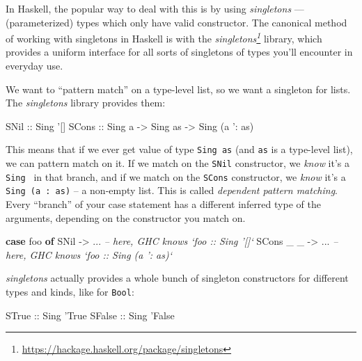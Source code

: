 \documentclass[]{article}
\newenvironment{Shaded}{}{}
\newcommand{\KeywordTok}[1]{\textcolor[rgb]{0.00,0.44,0.13}{\textbf{{#1}}}}
\newcommand{\DataTypeTok}[1]{\textcolor[rgb]{0.56,0.13,0.00}{{#1}}}
\newcommand{\CharTok}[1]{\textcolor[rgb]{0.25,0.44,0.63}{{#1}}}
\newcommand{\CommentTok}[1]{\textcolor[rgb]{0.38,0.63,0.69}{\textit{{#1}}}}
\newcommand{\OtherTok}[1]{\textcolor[rgb]{0.00,0.44,0.13}{{#1}}}
\newcommand{\FunctionTok}[1]{\textcolor[rgb]{0.02,0.16,0.49}{{#1}}}
\newcommand{\NormalTok}[1]{{#1}}
\renewcommand{\href}[2]{#2\footnote{\url{#1}}}
\begin{document}
In Haskell, the popular way to deal with this is by using \emph{singletons} ---
(parameterized) types which only have valid constructor. The canonical method of
working with singletons in Haskell is with the
\emph{\href{https://hackage.haskell.org/package/singletons}{singletons}}
library, which provides a uniform interface for all sorts of singletons of types
you'll encounter in everyday use.

We want to ``pattern match'' on a type-level list, so we want a singleton for
lists. The \emph{singletons} library provides them:

\begin{Shaded}
\begin{Highlighting}[]
\DataTypeTok{SNil}\OtherTok{  ::} \DataTypeTok{Sing} \CharTok{'[]}
\DataTypeTok{SCons}\OtherTok{ ::} \DataTypeTok{Sing} \NormalTok{a }\OtherTok{->} \DataTypeTok{Sing} \NormalTok{as }\OtherTok{->} \DataTypeTok{Sing} \NormalTok{(a }\CharTok{': as)}
\end{Highlighting}
\end{Shaded}

This means that if we ever get value of type \texttt{Sing\ as} (and \texttt{as}
is a type-level list), we can pattern match on it. If we match on the
\texttt{SNil} constructor, we \emph{know} it's a
\texttt{Sing\ \textquotesingle{}{[}{]}} in that branch, and if we match on the
\texttt{SCons} constructor, we \emph{know} it's a
\texttt{Sing\ (a\ \textquotesingle{}:\ as)} -- a non-empty list. This is called
\emph{dependent pattern matching}. Every ``branch'' of your case statement has a
different inferred type of the arguments, depending on the constructor you match
on.

\begin{Shaded}
\begin{Highlighting}[]
\KeywordTok{case} \NormalTok{foo }\KeywordTok{of}
  \DataTypeTok{SNil}      \OtherTok{->} \FunctionTok{...}   \CommentTok{-- here, GHC knows `foo :: Sing '[]`}
  \DataTypeTok{SCons} \NormalTok{_ _ }\OtherTok{->} \FunctionTok{...}   \CommentTok{-- here, GHC knows `foo :: Sing (a ': as)`}
\end{Highlighting}
\end{Shaded}

\emph{singletons} actually provides a whole bunch of singleton constructors for
different types and kinds, like for \texttt{Bool}:

\begin{Shaded}
\begin{Highlighting}[]
\DataTypeTok{STrue}\OtherTok{  ::} \DataTypeTok{Sing} \CharTok{'True}
\DataTypeTok{SFalse}\OtherTok{ ::} \DataTypeTok{Sing} \CharTok{'False}
\end{Highlighting}
\end{Shaded}
\end{document}
